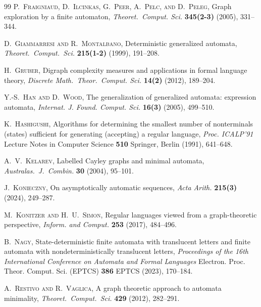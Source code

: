 \documentclass[12pt]{article}
\begin{document}
\begin{thebibliography}{99}
 \textsc{P.\ Fraigniaud, D.\ Ilcinkas, 
 G.\ Peer, A.\ Pelc, and D.\ Peleg}, 
 Graph exploration by a finite automaton, 
 \emph{Theoret.\ Comput. Sci.} {\bf 345(2-3)} (2005), 331--344. 

 \textsc{D.\ Giammarresi and R.\ Montalbano}, 
 Deterministic generalized automata, 
 \emph{Theoret.\ Comput.\ Sci.} {\bf 215(1-2)} (1999), 191--208. 

 \textsc{H.\ Gruber}, 
 Digraph complexity measures and applications in formal language theory, 
 \emph{Discrete Math.\ Theor.\ Comput. Sci.} {\bf 14(2)} (2012), 189--204. 

 \textsc{Y.-S.\ Han and D.\ Wood}, 
 The generalization of generalized automata: expression automata, 
 \emph{Internat. J. Found. Comput. Sci.} {\bf 16(3)} (2005), 499--510. 

 \textsc{K.\ Hashigushi}, 
 Algorithms for determining the smallest number of nonterminals (states) sufficient for generating (accepting) a regular language, 
 \emph{Proc. ICALP'91} Lecture Notes in Computer Science {\bf 510} 
 Springer, Berlin (1991), 641--648. 

 \textsc{A.\ V.\ Kelarev}, 
 Labelled {C}ayley graphs and minimal automata, 
 \emph{Australas.\ J.\ Combin.} {\bf 30} (2004), 95--101. 

 \textsc{J.\ Konieczny}, 
 On asymptotically automatic sequences, 
 \emph{Acta Arith.} {\bf 215(3)} (2024), 249--287. 

 \textsc{M.\ Konitzer and H.\ U.\ Simon}, 
 Regular languages viewed from a graph-theoretic perspective, 
 \emph{Inform. and Comput.} {\bf 253} (2017), 484--496. 

 \textsc{B.\ Nagy}, 
 State-deterministic finite automata with translucent letters
 and finite automata with nondeterministically translucent letters, 
 \emph{Proceedings of the 16th {I}nternational {C}onference on
 {A}utomata and {F}ormal {L}anguages} 
 Electron. Proc. Theor. Comput. Sci. (EPTCS) {\bf 386} 
 EPTCS (2023), 170--184. 

 \textsc{A.\ Restivo and R.\ Vaglica}, 
 A graph theoretic approach to automata minimality, 
 \emph{Theoret.\ Comput.\ Sci.} {\bf 429} (2012), 282--291. 


\end{thebibliography}
\end{document}
